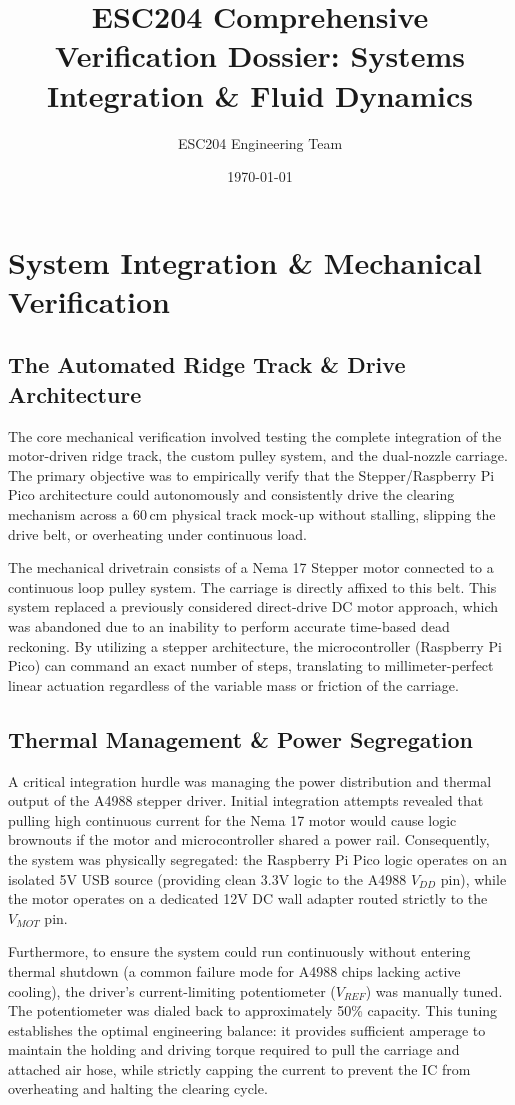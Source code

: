 \documentclass{article}
\title{ESC204 Comprehensive Verification Dossier: Systems Integration \& Fluid Dynamics}
\author{ESC204 Engineering Team}
\date{\today}
\begin{document}
\maketitle

\section{System Integration \& Mechanical Verification}
\subsection{The Automated Ridge Track \& Drive Architecture}
The core mechanical verification involved testing the complete integration of the motor-driven ridge track, the custom pulley system, and the dual-nozzle carriage. The primary objective was to empirically verify that the Stepper/Raspberry Pi Pico architecture could autonomously and consistently drive the clearing mechanism across a 60\,cm physical track mock-up without stalling, slipping the drive belt, or overheating under continuous load.

The mechanical drivetrain consists of a Nema 17 Stepper motor connected to a continuous loop pulley system. The carriage is directly affixed to this belt. This system replaced a previously considered direct-drive DC motor approach, which was abandoned due to an inability to perform accurate time-based dead reckoning. By utilizing a stepper architecture, the microcontroller (Raspberry Pi Pico) can command an exact number of steps, translating to millimeter-perfect linear actuation regardless of the variable mass or friction of the carriage.

\subsection{Thermal Management \& Power Segregation}
A critical integration hurdle was managing the power distribution and thermal output of the A4988 stepper driver. Initial integration attempts revealed that pulling high continuous current for the Nema 17 motor would cause logic brownouts if the motor and microcontroller shared a power rail. Consequently, the system was physically segregated: the Raspberry Pi Pico logic operates on an isolated 5V USB source (providing clean 3.3V logic to the A4988 $V_{DD}$ pin), while the motor operates on a dedicated 12V DC wall adapter routed strictly to the $V_{MOT}$ pin.

Furthermore, to ensure the system could run continuously without entering thermal shutdown (a common failure mode for A4988 chips lacking active cooling), the driver's current-limiting potentiometer ($V_{REF}$) was manually tuned. The potentiometer was dialed back to approximately 50\% capacity. This tuning establishes the optimal engineering balance: it provides sufficient amperage to maintain the holding and driving torque required to pull the carriage and attached air hose, while strictly capping the current to prevent the IC from overheating and halting the clearing cycle.
\end{document}
